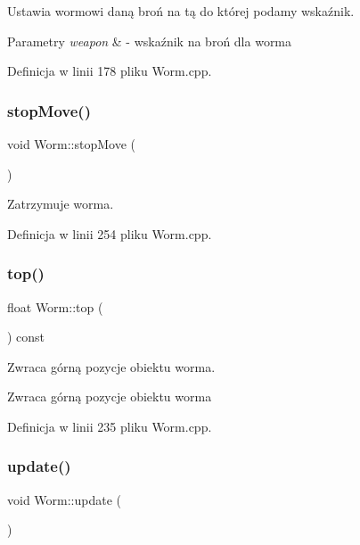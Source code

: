 Ustawia wormowi daną broń na tą do której podamy wskaźnik. 


\begin{DoxyParams}{Parametry}
{\em weapon} & -\/ wskaźnik na broń dla worma \\
\hline
\end{DoxyParams}


Definicja w linii 178 pliku Worm.\+cpp.

\mbox{\label{class_worm_a1cdb0c544127417ba4b95fd8e5d3f9fc}} 
\subsubsection{\texorpdfstring{stop\+Move()}{stopMove()}}
{\footnotesize\ttfamily void Worm\+::stop\+Move (\begin{DoxyParamCaption}{ }\end{DoxyParamCaption})}



Zatrzymuje worma. 



Definicja w linii 254 pliku Worm.\+cpp.

\mbox{\label{class_worm_a3d65c40350e8e0317bd594a3cb7c8bba}} 
\subsubsection{\texorpdfstring{top()}{top()}}
{\footnotesize\ttfamily float Worm\+::top (\begin{DoxyParamCaption}{ }\end{DoxyParamCaption}) const}



Zwraca górną pozycje obiektu worma. 

\begin{DoxyReturn}{Zwraca}
górną pozycje obiektu worma 
\end{DoxyReturn}


Definicja w linii 235 pliku Worm.\+cpp.

\mbox{\label{class_worm_adcb6219ae98887e491327c4ef02cf4b9}} 
\subsubsection{\texorpdfstring{update()}{update()}}
{\footnotesize\ttfamily void Worm\+::update (\begin{DoxyParamCaption}{ }\end{DoxyParamCaption})}



